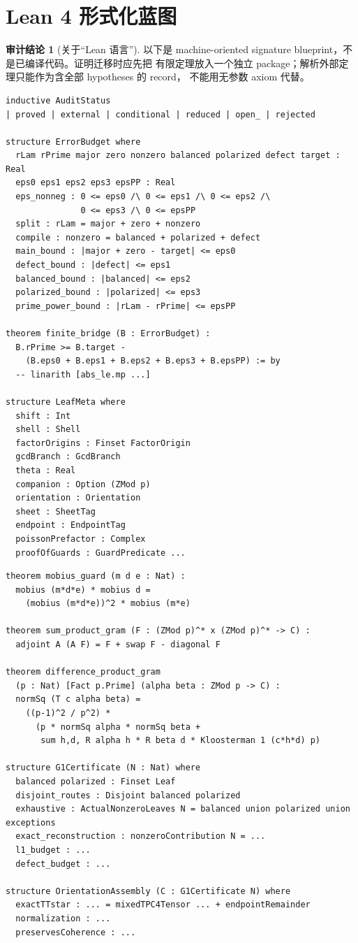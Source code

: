 \documentclass[11pt,a4paper]{ctexart}
\theoremstyle{definition}
\newtheorem{audit}[theorem]{审计结论}
\newcommand{\1}{\mathbf 1}
\begin{document}
\section{Lean 4 形式化蓝图}
\label{sec:lean}

\begin{audit}[关于“Lean 语言”]
以下是 machine-oriented signature blueprint，不是已编译代码。证明迁移时应先把
有限定理放入一个独立 package；解析外部定理只能作为含全部 hypotheses 的 record，
不能用无参数 axiom 代替。
\end{audit}

\begin{lstlisting}[language={},caption={建议的核心状态与 Goldbach bridge 签名；省略号仅表示尚待定义的项目类型}]
inductive AuditStatus
| proved | external | conditional | reduced | open_ | rejected

structure ErrorBudget where
  rLam rPrime major zero nonzero balanced polarized defect target : Real
  eps0 eps1 eps2 eps3 epsPP : Real
  eps_nonneg : 0 <= eps0 /\ 0 <= eps1 /\ 0 <= eps2 /\
               0 <= eps3 /\ 0 <= epsPP
  split : rLam = major + zero + nonzero
  compile : nonzero = balanced + polarized + defect
  main_bound : |major + zero - target| <= eps0
  defect_bound : |defect| <= eps1
  balanced_bound : |balanced| <= eps2
  polarized_bound : |polarized| <= eps3
  prime_power_bound : |rLam - rPrime| <= epsPP

theorem finite_bridge (B : ErrorBudget) :
  B.rPrime >= B.target -
    (B.eps0 + B.eps1 + B.eps2 + B.eps3 + B.epsPP) := by
  -- linarith [abs_le.mp ...]

structure LeafMeta where
  shift : Int
  shell : Shell
  factorOrigins : Finset FactorOrigin
  gcdBranch : GcdBranch
  theta : Real
  companion : Option (ZMod p)
  orientation : Orientation
  sheet : SheetTag
  endpoint : EndpointTag
  poissonPrefactor : Complex
  proofOfGuards : GuardPredicate ...
\end{lstlisting}

\begin{lstlisting}[language={},caption={有限域核心接口；这是 signature schema，不声称已编译}]
theorem mobius_guard (m d e : Nat) :
  mobius (m*d*e) * mobius d =
    (mobius (m*d*e))^2 * mobius (m*e)

theorem sum_product_gram (F : (ZMod p)^* x (ZMod p)^* -> C) :
  adjoint A (A F) = F + swap F - diagonal F

theorem difference_product_gram
  (p : Nat) [Fact p.Prime] (alpha beta : ZMod p -> C) :
  normSq (T c alpha beta) =
    ((p-1)^2 / p^2) *
      (p * normSq alpha * normSq beta +
       sum h,d, R alpha h * R beta d * Kloosterman 1 (c*h*d) p)

structure G1Certificate (N : Nat) where
  balanced polarized : Finset Leaf
  disjoint_routes : Disjoint balanced polarized
  exhaustive : ActualNonzeroLeaves N = balanced union polarized union exceptions
  exact_reconstruction : nonzeroContribution N = ...
  l1_budget : ...
  defect_budget : ...

structure OrientationAssembly (C : G1Certificate N) where
  exactTTstar : ... = mixedTPC4Tensor ... + endpointRemainder
  normalization : ...
  preservesCoherence : ...
\end{lstlisting}
\end{document}
